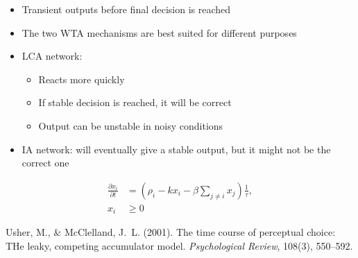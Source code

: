 \documentclass[final]{beamer}
\begin{document}
\begin{frame}[t]
\begin{tcbraster}[raster columns=4, raster column skip=10mm, raster row skip=10mm, raster equal height=rows, raster force size=false]
\begin{tcolorbox}[title=Benchmarks, add to width=-3cm]
\begin{itemize}
                \item Transient outputs before final decision is reached
            \end{itemize}
        \end{tcolorbox}
        \begin{tcolorbox}[title=Conclusions, add to width=0cm]
            \begin{itemize}
                \item The two WTA mechanisms are best suited for different purposes
                \item LCA network:
                    \begin{itemize}
                        \item Reacts more quickly
                        \item If stable decision is reached, it will be correct
                        \item Output can be unstable in noisy conditions
                    \end{itemize}
                    \item IA network: will eventually give a stable output, but it might not be the correct one
            \end{itemize}
        \end{tcolorbox}
        \begin{tcolorbox}[raster multicolumn=4,title={Leaky, Competing Accumulators (LCA)},halign title=left]
            \begin{minipage}[c][6in]{20cm}
                \vfill
                \vfill
                \begin{align*}
                    \frac{{\partial x}_i}{\partial t} &= \left(\rho_i - kx_i - \beta \sum_{j \neq i} x_j\right) \frac{1}{\tau},\\
                    x_i &\ge 0
                \end{align*}
                \vfill
                {\tiny Usher, M., \& McClelland, J.~L. (2001). The time course of perceptual choice: THe leaky, competing accumulator model. \textit{Psychological Review}, 108(3), 550--592.\par}
            \end{minipage}
            \hfill
            \hfill

\end{tcolorbox}
\end{tcbraster}
\end{frame}
\end{document}
